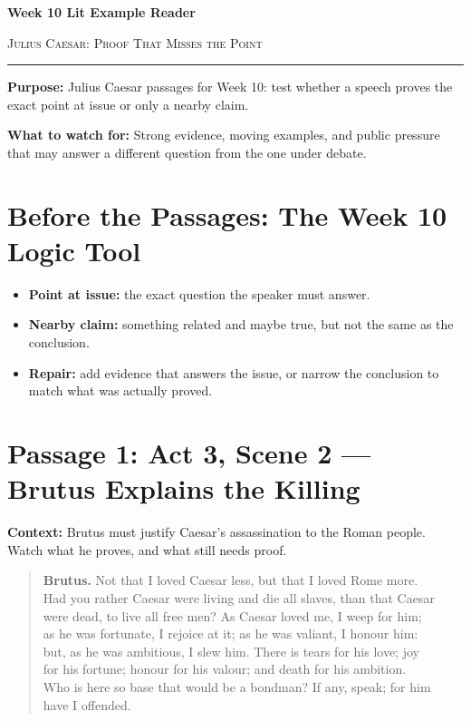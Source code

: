 \documentclass[12pt]{article}
\newenvironment{playpassage}{\begin{quote}\footnotesize\setlength{\parskip}{0.08em}\setlength{\parindent}{0pt}}{\end{quote}}
\newcommand{\speaker}[1]{\textbf{#1.}}
\begin{document}
\begin{center}
{\LARGE\bfseries Week 10 Lit Example Reader}\par\vspace{0.02em}
{\large\scshape Julius Caesar: Proof That Misses the Point}\par\vspace{0.06em}
\rule{0.78\textwidth}{0.5pt}
\end{center}

\textbf{Purpose:} Julius Caesar passages for Week 10: test whether a speech proves the exact point at issue or only a nearby claim.

\textbf{What to watch for:} Strong evidence, moving examples, and public pressure that may answer a different question from the one under debate.

\section*{Before the Passages: The Week 10 Logic Tool}

\begin{itemize}[leftmargin=1.3em,itemsep=0.05em,topsep=0.08em,parsep=0.03em]
\item \textbf{Point at issue:} the exact question the speaker must answer.
\item \textbf{Nearby claim:} something related and maybe true, but not the same as the conclusion.
\item \textbf{Repair:} add evidence that answers the issue, or narrow the conclusion to match what was actually proved.
\end{itemize}

\section*{Passage 1: Act 3, Scene 2 --- Brutus Explains the Killing}

\textbf{Context:} Brutus must justify Caesar's assassination to the Roman people. Watch what he proves, and what still needs proof.

\begin{playpassage}
\speaker{Brutus} Not that I loved Caesar less, but that I loved Rome more.\\
Had you rather Caesar were living and die all slaves, than that Caesar\\
were dead, to live all free men? As Caesar loved me, I weep for him;\\
as he was fortunate, I rejoice at it; as he was valiant, I honour him:\\
but, as he was ambitious, I slew him. There is tears for his love; joy\\
for his fortune; honour for his valour; and death for his ambition.\\
Who is here so base that would be a bondman? If any, speak; for him\\
have I offended.
\end{playpassage}
\end{document}
